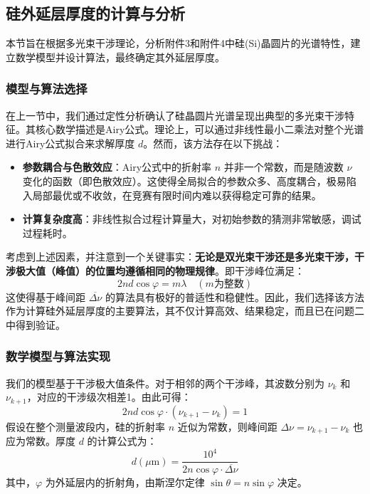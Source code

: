 \documentclass{ctexart} %
\begin{document}
\subsection{硅外延层厚度的计算与分析}

本节旨在根据多光束干涉理论，分析附件3和附件4中硅(Si)晶圆片的光谱特性，建立数学模型并设计算法，最终确定其外延层厚度。

\subsubsection{模型与算法选择}

在上一节中，我们通过定性分析确认了硅晶圆片光谱呈现出典型的多光束干涉特征。其核心数学描述是Airy公式。理论上，可以通过非线性最小二乘法对整个光谱进行Airy公式拟合来求解厚度 $d$。然而，该方法存在以下挑战：
\begin{itemize}
    \item \textbf{参数耦合与色散效应}：Airy公式中的折射率 $n$ 并非一个常数，而是随波数 $\nu$ 变化的函数（即色散效应）。这使得全局拟合的参数众多、高度耦合，极易陷入局部最优或不收敛，在竞赛有限时间内难以获得稳定可靠的结果。
    \item \textbf{计算复杂度高}：非线性拟合过程计算量大，对初始参数的猜测非常敏感，调试过程耗时。
\end{itemize}

考虑到上述因素，并注意到一个关键事实：\textbf{无论是双光束干涉还是多光束干涉，干涉极大值（峰值）的位置均遵循相同的物理规律}。即干涉峰位满足：
$$
    2nd\cos\varphi = m\lambda \quad (m \text{为整数})
$$
这使得基于峰间距 $\overline{\Delta\nu}$ 的算法具有极好的普适性和稳健性。因此，我们选择该方法作为计算硅外延层厚度的主要算法，其不仅计算高效、结果稳定，而且已在问题二中得到验证。

\subsubsection{数学模型与算法实现}

我们的模型基于干涉极大值条件。对于相邻的两个干涉峰，其波数分别为 $\nu_k$ 和 $\nu_{k+1}$，对应的干涉级次相差1。由此可得：
$$
    2nd\cos\varphi \cdot (\nu_{k+1} - \nu_k) = 1
$$
假设在整个测量波段内，硅的折射率 $n$ 近似为常数，则峰间距 $\Delta\nu = \nu_{k+1} - \nu_k$ 也应为常数。厚度 $d$ 的计算公式为：
$$
    d (\mu\text{m}) = \frac{10^4}{2n\cos\varphi \cdot \overline{\Delta\nu}}
$$
其中，$\varphi$ 为外延层内的折射角，由斯涅尔定律 $\sin\theta = n\sin\varphi$ 决定。
\end{document}
